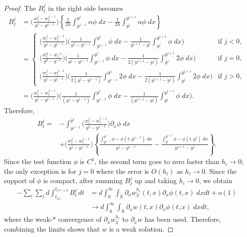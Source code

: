 \documentclass[a4paper,11pt]{article}
\def\R{\mathbb{R}}
\theoremstyle{remark}
\begin{document}
\begin{proof}
The $B^j_\ell$ in the right side becomes
\begin{align*}
 B_\ell^j &= \Big(\tfrac{w^{j}_{\ell} - w^{j-1}_{\ell}}{y^{j}-y^{j-1}}\Big)
        \left\{\frac{1}{2h}\int_{y^{j-1}}^{y^{j}} \alpha\phi  \; dx -
        \frac{1}{2h}\int_{y^{j}}^{y^{j+1}} \alpha\phi  \; dx\right\}\\
     &= \left\{\begin{array}{ll}
        \Big(\tfrac{w^{j}_{\ell} - w^{j-1}_{\ell}}{y^{j}-y^{j-1}}\Big)
        \bigg( \frac{1}{y^j-y^{j-1}}\int_{y^{j-1}}^{y^{j}} \phi  \; dx-
        \frac{1}{y^{j+1}-y^{j}}\int_{y^{j}}^{y^{j+1}} \phi  \; dx \bigg)
        & \text{if } j<0,\\
        \Big(\tfrac{w^{0}_{\ell} - w^{-1}_{\ell}}{y^{0}-y^{-1}}\Big)
        \bigg( \frac{1}{y^j-y^{j-1}}\int_{y^{j-1}}^{y^{j}} \phi  \; dx-
        \frac{1}{2(y^{j+1}-y^{j})}\int_{y^{j}}^{y^{j+1}} 2\phi  \; dx
        \bigg) & \text{if } j=0,\\
        \Big(\tfrac{w^{j}_{\ell} - w^{j-1}_{\ell}}{y^{j}-y^{j-1}}\Big)
        \bigg( \frac{1}{2(y^j-y^{j-1})}\int_{y^{j-1}}^{y^{j}} 2\phi  \; dx-
        \frac{1}{2(y^{j+1}-y^{j})}\int_{y^{j}}^{y^{j+1}} 2\phi  \; dx
        \bigg) & \text{if } j>0,
       \end{array}\right.\\
     &=\Big(\tfrac{w^{j}_{\ell} - w^{j-1}_{\ell}}{y^{j}-y^{j-1}}\Big)
        \bigg( \frac{1}{(y^j-y^{j-1})}\int_{y^{j-1}}^{y^{j}} \phi  \; dx-
        \frac{1}{(y^{j+1}-y^{j})}\int_{y^{j}}^{y^{j+1}} \phi  \; dx
        \bigg).
\end{align*}
Therefore,
\begin{align*}
 B_\ell^j =&-\int_{y^{j-1}}^{y^{j}}\Big(\tfrac{w^{j}_{\ell} -
 w^{j-1}_{\ell}}{y^{j}-y^{j-1}}\Big)\partial_x\phi \;dx \\
     & + \Big(\tfrac{w^{j}_{\ell} -
     w^{j-1}_{\ell}}{y^{j}-y^{j-1}}\Big)\left\{
        \frac{\int_{y^{j-1}}^{y^{j}} \phi -\phi(t,y^{j-1}) \;
        dx}{y^j-y^{j-1}} - \frac{\int_{y^{j}}^{y^{j+1}} \phi -\phi(t,y^{j})
        \; dx}{y^{j+1}-y^j} \right\}.
\end{align*}
Since the test function $\phi$ is $C^1$, the second term goes to zero faster than $h_i\to0$; the only exception is for $j=0$ where the error is $O(h_i)$ as $h_i\to0$.
Since the support of $\phi$ is compact, after summing $B_\ell^j$ up and taking $h_i\to0$, we obtain
\begin{align*}
-\sum_{\ell}\sum_{j}d\int_{t_{2\ell}}^{t_{2\ell+2}}B_\ell^j\,dt &= d\int_0^\infty\int_\R \partial_x w_3^{h_i}(t,x) \partial_x \phi(t,x) \;
dxdt + o(1) \\
&\rightarrow d\int_0^\infty\int_\R \partial_x w(t,x) \partial_x \phi(t,x) \; dxdt,
\end{align*}
where the weak-* convergence of $\partial_x w_3^{h_i}$ to $\partial_x w$ has been used.
Therefore, combining the limits shows that $w$ is a weak solution.
\end{proof}
\end{document}
